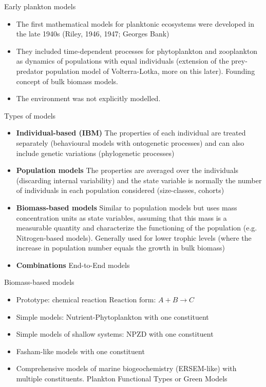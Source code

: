 \documentclass[english,aspectratio=169]{beamer}
\begin{document}
\begin{frame}{Early plankton models}
\begin{itemize}
\item The first mathematical models for planktonic ecosystems were developed in the late 1940s (Riley, 1946, 1947; Georges Bank)
\item They included time-dependent processes for phytoplankton and zooplankton as dynamics of populations with equal individuals (extension of the prey-predator population model of Volterra-Lotka, more on this later). Founding concept of bulk biomass models.
\item The environment was not explicitly modelled.
\end{itemize}
\end{frame}

\begin{frame}{Types of models}
\begin{itemize}
\item \textbf{Individual-based (IBM)} The properties of each individual are treated separately (behavioural models with ontogenetic processes) and can also include genetic variations (phylogenetic processes)
\item \textbf{Population models} The properties are averaged over the individuals (discarding internal variability) and the state variable is normally the number of individuals in each population considered (size-classes, cohorts)
\item \textbf{Biomass-based models} Similar to population models but uses mass concentration  units as state variables, assuming that this mass is a measurable quantity and characterize the functioning of the population (e.g. Nitrogen-based models). Generally used for lower trophic levels (where the increase in population number equals the growth in bulk biomass)
\item \textbf{Combinations} End-to-End models
\end{itemize}
\end{frame}

\begin{frame}{Biomass-based models}
\begin{itemize}
    \item Prototype: chemical reaction $\text{Reaction form: } A + B \rightarrow C$
    \item Simple models: Nutrient-Phytoplankton with one constituent
    \item Simple models of shallow systems: NPZD with one constituent
    \item Fasham-like models with one constituent
    \item Comprehensive models of marine biogeochemistry (ERSEM-like) with multiple constituents. Plankton Functional Types or Green Models
\end{itemize}

\end{frame}
\end{document}
